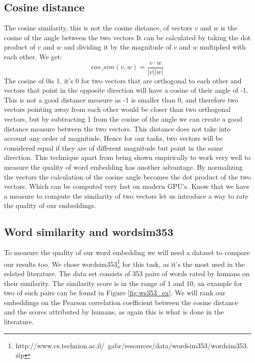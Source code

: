 \subsection{Cosine distance}
The cosine similarity, this is not the cosine distance, of vectors $v$ and $w$ is the cosine of the angle between the two vectors It can be calculated by taking the dot product of $v$ and $w$ and dividing it by the magnitude of $v$ and $w$ multiplied with each other. We get:
\begin{equation}
cos\_sim(v,w) = \frac{v \cdot w}{|v| |w|} 
\end{equation}
The cosine of 0\textdegree is 1,  it's 0 for two vectors that are orthogonal to each other and vectors that point in the opposite direction will have a cosine of their angle of -1. This is not a good distance measure as -1 is smaller than 0, and therefore two vectors pointing away from each other would be closer than two orthogonal vectors, but by subtracting 1 from the cosine of the angle we can create a good distance measure between the two vectors. This distance does not take into account any order of magnitude. Hence for our tasks, two vectors will be considered equal if they are of different magnitude but point in the same direction. 
This technique apart from being shown empirically to work very well to measure the quality of word embedding has another advantage. By normalizing the vectors the calculation of the cosine angle becomes the dot product of the two vectors. Which can be computed very fast on modern GPU's. 
Know that we have a measure to compute the similarity of two vectors let us introduce a way to rate the quality of our embeddings.


\subsection{Word similarity and wordsim353}
To measure the quality of our word embedding we will need a dataset to compare our results too. We chose  wordsim353\footnote{http://www.cs.technion.ac.il/~gabr/resources/data/wordsim353/wordsim353.zip} for this task, as it's the most used in the related literature. The data set consists of 353 pairs of words rated by humans on their similarity. The similarity score is in the range of 1 and 10, an example for two of such pairs can be found in Figure \ref{fig:ws353_ex}. We will rank our embeddings on the Pearson correlation coefficient between the cosine distance and the scores attributed by humans, as again this is what is done in the literature. 


